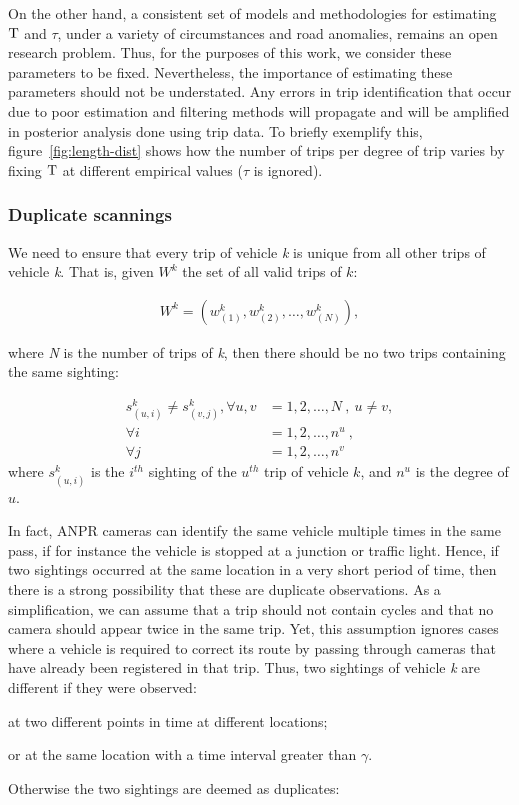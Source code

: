 On the other hand, a consistent set of models and methodologies for estimating $\mathrm{T}$ and $\tau$, under a variety of circumstances and road anomalies, remains an open research problem. Thus, for the purposes of this work, we consider these parameters to be fixed. Nevertheless, the importance of estimating these parameters should not be understated. Any errors in trip identification that occur due to poor estimation and filtering methods will propagate and will be amplified in posterior analysis done using trip data. To briefly exemplify this, figure~\ref{fig:length-dist} shows how the number of trips per degree of trip varies by fixing $\mathrm{T}$ at different empirical values ($\tau$ is ignored).

\subsubsection*{Duplicate scannings}

We need to ensure that every trip of vehicle \emph{k} is unique from all other trips of vehicle \emph{k}. That is, given $W^k$ the set of all valid trips of $k$:

\begin{align}
W^{k} = \left( w^{k}_{(1)}, w^{k}_{(2)}, \ldots, w^{k}_{(N)} \right) \label{e.trip.history},
\end{align}

where \emph{N} is the number of trips of \emph{k}, then there should be no two trips containing the same sighting:

\vspace{-0.5cm}
\begin{align}
s^{k}_{(u,i)} \neq s^{k}_{(v,j)}, \forall u,v &= 1, 2, \ldots, N \ , \ u \neq v,  \label{e.trip.history.constraint} \\
\forall i &= 1, 2, \ldots, n^u \ , \\
\forall j &= 1, 2, \ldots, n^v \  \nonumber
\end{align}
where $s_{(u,i)}^k$ is the $i^{th}$ sighting of the $u^{th}$ trip of vehicle $k$, and $n^u$ is the degree of $u$.

In fact, ANPR cameras can identify the same vehicle multiple times in the same pass, if for instance the vehicle is stopped at a junction or traffic light. Hence, if two sightings occurred at the same location in a very short period of time, then there is a strong possibility that these are duplicate observations. As a simplification, we can assume that a trip should not contain cycles and that no camera should appear twice in the same trip. Yet, this assumption ignores cases where a vehicle is required to correct its route by passing through cameras that have already been registered in that trip. Thus, two sightings of vehicle \emph{k} are different if they were observed:
\begin{enumerate*}[label=(\roman*)]
  \item at two different points in time at different locations;
  \item or at the same location with a time interval greater than $\gamma$.
\end{enumerate*}
Otherwise the two sightings are deemed as duplicates:

